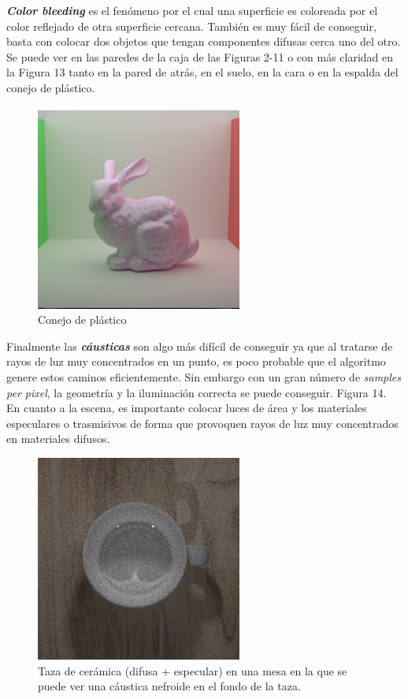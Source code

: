 \documentclass{article}
\begin{document}
\textbf{\textit{Color bleeding}} es el fenómeno por el cual una superficie es
coloreada por el color reflejado de otra superficie cercana. También es muy
fácil de conseguir, basta con colocar dos objetos que tengan componentes difusas cerca uno del otro. Se puede
ver en las paredes de la caja de las Figuras 2-11 o con más claridad en la
Figura 13 tanto en la pared de atrás, en el suelo, en la cara o en la espalda
del conejo de plástico. \\

\begin{figure}[H]
\centering
\includegraphics[width=0.5\linewidth]{imgs/plastic_bunny.png}
\caption{Conejo de plástico}
\end{figure}

Finalmente las \textbf{\textit{cáusticas}} son algo más difícil de conseguir ya
que al tratarse de rayos de luz muy concentrados en un punto, es poco probable
que el algoritmo genere estos caminos eficientemente. Sin embargo con un gran
número de \textit{samples per pixel}, la geometría y la iluminación correcta se
puede conseguir. Figura 14. En cuanto a la escena, es importante colocar luces de área y los materiales especulares o trasmisivos de forma que provoquen rayos de luz muy concentrados en materiales difusos.
\begin{figure}[H]
\centering
\includegraphics[width=0.5\linewidth]{imgs/nephroid.png}
\caption{Taza de cerámica (difusa + especular) en una mesa en la
  que se puede ver una cáustica nefroide en el fondo de la taza.}
\end{figure}
\end{document}
